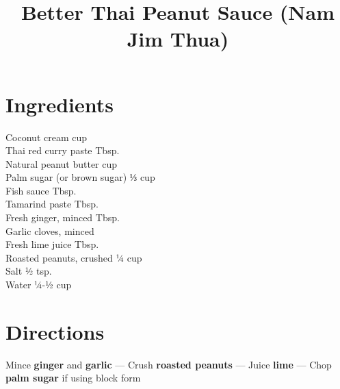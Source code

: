 \documentclass[11pt,letterpaper]{article}
\title{Better Thai Peanut Sauce (Nam Jim Thua)}
\author{}
\date{}
\begin{document}
\maketitle
\thispagestyle{empty}

\section*{Ingredients}
\setlength{\columnsep}{20pt}
\begin{multicols}{2}
\noindent
    Coconut cream  cup \\
    Thai red curry paste  Tbsp. \\
    Natural peanut butter  cup \\
    Palm sugar (or brown sugar) \dotfill ⅓ cup \\
    Fish sauce  Tbsp. \\
    Tamarind paste  Tbsp. \\
    \columnbreak
    Fresh ginger, minced  Tbsp. \\
    Garlic cloves, minced  \\
    Fresh lime juice  Tbsp. \\
    Roasted peanuts, crushed \dotfill ¼ cup \\
    Salt \dotfill ½ tsp. \\
    Water \dotfill ¼-½ cup \\
\end{multicols}

\section*{Directions}

\noindent
Mince \textbf{ginger} and \textbf{garlic} ---
Crush \textbf{roasted peanuts} ---
Juice \textbf{lime} ---
Chop \textbf{palm sugar} if using block form
\end{document}
